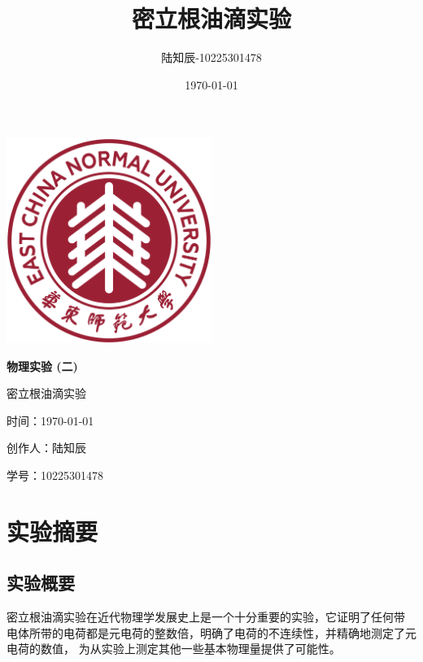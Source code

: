 \documentclass{ctexart}
\title{密立根油滴实验}
\author{陆知辰-10225301478}
\date{\today}
\begin{document}
\begin{titlepage}
  \centering
  \includegraphics[width=0.5\textwidth]{ecnu.png}
  
  \vspace*{\baselineskip}
  
  \Huge\textbf{物\quad 理\quad 实\quad 验 \quad (二)}
  \vspace*{0.3\baselineskip}
  
  \huge 密立根油滴实验
  
  \vspace*{2\baselineskip}
  
  \large 时间：\today
  
  \vspace*{\baselineskip}
  
  \large 创作人：陆知辰
  
  \vspace*{\baselineskip}
  
  \large 学号：10225301478
  
\end{titlepage}
\newpage
\tableofcontents
\newpage
\section{实验摘要}
  \subsection{实验概要}
  密立根油滴实验在近代物理学发展史上是一个十分重要的实验，它证明了任何带
  电体所带的电荷都是元电荷的整数倍，明确了电荷的不连续性，并精确地测定了元电荷的数值，
  为从实验上测定其他一些基本物理量提供了可能性。
\end{document}
